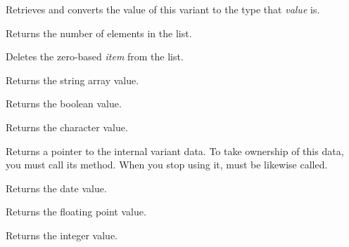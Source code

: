 Retrieves and converts the value of this variant to the type that {\it value} is.


\label{wxvariantgetcount}


Returns the number of elements in the list.

\label{wxvariantdelete}


Deletes the zero-based {\it item} from the list.

\label{wxvariantgetarraystring}


Returns the string array value.

\label{wxvariantgetbool}


Returns the boolean value.

\label{wxvariantgetchar}


Returns the character value.

\label{wxvariantgetdata}


Returns a pointer to the internal variant data. To take ownership
of this data, you must call its 
method. When you stop using it, 
must be likewise called.

\label{wxvariantgetdatetime}


Returns the date value.

\label{wxvariantgetdouble}


Returns the floating point value.

\label{wxvariantgetlong}


Returns the integer value.

